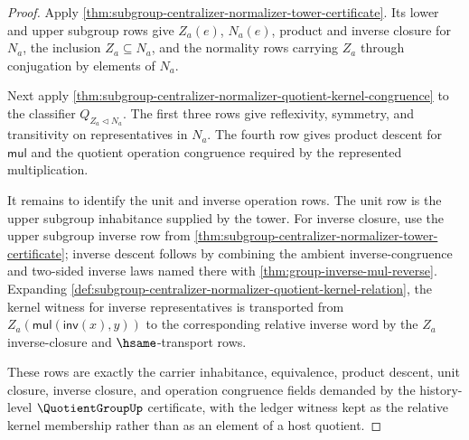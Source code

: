 \begin{proof}
Apply
\autoref{thm:subgroup-centralizer-normalizer-tower-certificate}. Its lower
and upper subgroup rows give $Z_a(e)$, $N_a(e)$, product and inverse closure
for $N_a$, the inclusion $Z_a\subseteq N_a$, and the normality rows carrying
$Z_a$ through conjugation by elements of $N_a$.

Next apply
\autoref{thm:subgroup-centralizer-normalizer-quotient-kernel-congruence} to
the classifier
$Q_{Z_a\triangleleft N_a}$. The first three rows give reflexivity, symmetry,
and transitivity on representatives in $N_a$. The fourth row gives product
descent for $\mathsf{mul}$ and the quotient operation congruence required by
the represented multiplication.

It remains to identify the unit and inverse operation rows. The unit row is
the upper subgroup inhabitance supplied by the tower. For inverse closure, use
the upper subgroup inverse row from
\autoref{thm:subgroup-centralizer-normalizer-tower-certificate}; inverse
descent follows by combining the ambient inverse-congruence and two-sided
inverse laws named there with
\autoref{thm:group-inverse-mul-reverse}. Expanding
\autoref{def:subgroup-centralizer-normalizer-quotient-kernel-relation}, the
kernel witness for inverse representatives is transported from
$Z_a(\mathsf{mul}(\mathsf{inv}(x),y))$ to the corresponding relative inverse
word by the $Z_a$ inverse-closure and $\hsame$-transport rows.

These rows are exactly the carrier inhabitance, equivalence, product descent,
unit closure, inverse closure, and operation congruence fields demanded by the
history-level $\QuotientGroupUp$ certificate, with the ledger witness kept as
the relative kernel membership rather than as an element of a host quotient.
\end{proof}

